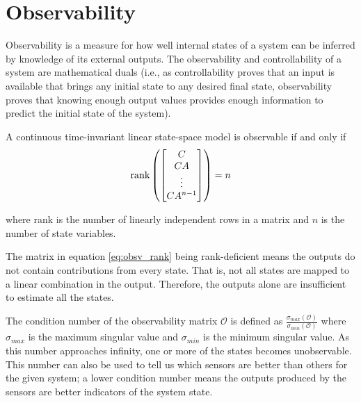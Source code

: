 \section{Observability}

Observability is a measure for how well internal \glspl{state} of a \gls{system}
can be inferred by knowledge of its external \glspl{output}. The observability
and controllability of a \gls{system} are mathematical duals (i.e., as
controllability proves that an \gls{input} is available that brings any initial
\gls{state} to any desired final \gls{state}, observability proves that knowing
enough \gls{output} values provides enough information to predict the initial
\gls{state} of the \gls{system}).
\begin{theorem}[Observability]
  A continuous \gls{time-invariant} linear state-space \gls{model} is observable
  if and only if
  \begin{equation}
    \operatorname{rank}\left(
    \begin{bmatrix}
      C \\
      CA \\
      \vdots \\
      CA^{n-1}
    \end{bmatrix}\right) = n \label{eq:obsv_rank}
  \end{equation}

  where rank is the number of linearly independent rows in a matrix and $n$ is
  the number of \gls{state} variables.
\end{theorem}

The matrix in equation \eqref{eq:obsv_rank} being rank-deficient means the
\glspl{output} do not contain contributions from every \gls{state}. That is, not
all \glspl{state} are mapped to a linear combination in the \gls{output}.
Therefore, the \glspl{output} alone are insufficient to estimate all the
\glspl{state}.

The condition number of the observability matrix $\mathcal{O}$ is defined as
$\frac{\sigma_{max}(\mathcal{O})}{\sigma_{min}(\mathcal{O})}$ where
$\sigma_{max}$ is the maximum singular value and
$\sigma_{min}$ is the minimum singular value. As this number approaches
infinity, one or more of the \glspl{state} becomes unobservable. This number can
also be used to tell us which sensors are better than others for the given
\gls{system}; a lower condition number means the \glspl{output} produced by the
sensors are better indicators of the \gls{system} \gls{state}.

